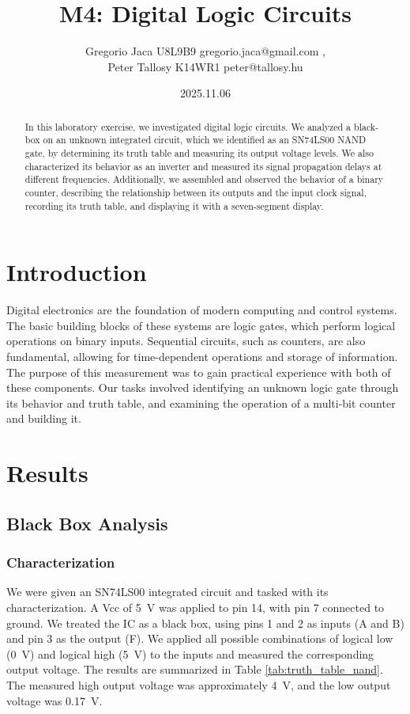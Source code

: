 \documentclass[12pt,a4paper]{article}
\title{M4: Digital Logic Circuits}
\author{Gregorio Jaca U8L9B9 gregorio.jaca@gmail.com , \\ Peter Tallosy K14WR1 peter@tallosy.hu }
\date{2025.11.06}
\begin{document}
\maketitle

\begin{abstract}
In this laboratory exercise, we investigated digital logic circuits. We analyzed a black-box on an unknown integrated circuit, which we identified as an SN74LS00 NAND gate, by determining its truth table and measuring its output voltage levels. We also characterized its behavior as an inverter and measured its signal propagation delays at different frequencies. Additionally, we assembled and observed the behavior of a binary counter, describing the relationship between its outputs and the input clock signal, recording its truth table, and displaying it with a seven-segment display.
\end{abstract}

\section{Introduction}
Digital electronics are the foundation of modern computing and control systems. The basic building blocks of these systems are logic gates, which perform logical operations on binary inputs. Sequential circuits, such as counters, are also fundamental, allowing for time-dependent operations and storage of information. The purpose of this measurement was to gain practical experience with both of these components. Our tasks involved identifying an unknown logic gate through its behavior and truth table, and examining the operation of a multi-bit counter and building it.

\section{Results}

\subsection{Black Box Analysis}

\subsubsection{Characterization}

We were given an SN74LS00 integrated circuit and tasked with its characterization. A Vcc of \SI{5}{\volt} was applied to pin 14, with pin 7 connected to ground. We treated the IC as a black box, using pins 1 and 2 as inputs (A and B) and pin 3 as the output (F). We applied all possible combinations of logical low (\SI{0}{\volt}) and logical high (\SI{5}{\volt}) to the inputs and measured the corresponding output voltage. The results are summarized in Table \ref{tab:truth_table_nand}. The measured high output voltage was approximately \SI{4}{\volt}, and the low output voltage was \SI{0.17}{\volt}.
\end{document}
